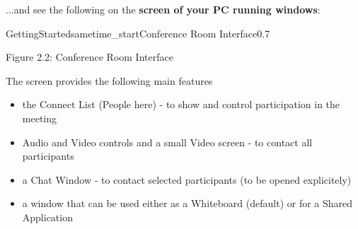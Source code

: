

...and see the following on the {\bf screen of your PC running windows}:


\begin{covimg}{GettingStarted}{sametime_start}{Conference Room Interface}{0.7}\end{covimg}
\begin{htmlonly}
Figure 2.2: Conference Room Interface 
\vspace{0.5cm}
\end{htmlonly}
The screen provides the following main features
\begin{itemize}
\item the Connect List (People here) - to show and control participation in the meeting
\item Audio and Video controls and a small Video screen - to contact all participants
\item a Chat Window - to contact selected participants (to be opened explicitely)
\item a window that can be used either as a Whiteboard (default) or for a Shared Application
\end{itemize}


